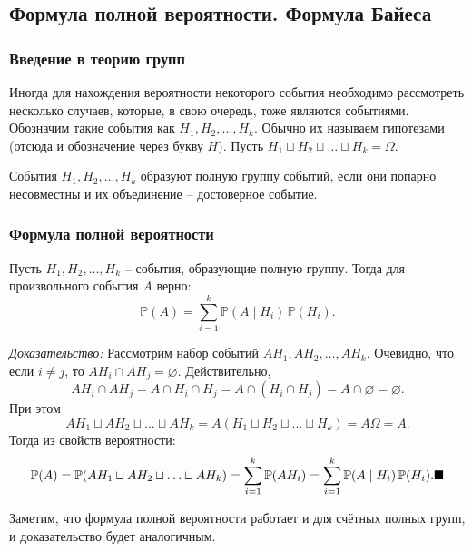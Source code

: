 \subsection{Формула полной вероятности. Формула Байеса}
\subsubsection{Введение в теорию групп}
Иногда для нахождения вероятности некоторого события необходимо рассмотреть несколько случаев, которые, в свою очередь, тоже являются событиями. Обозначим такие события как $H_1, H_2, \ldots, H_k$. Обычно их называем гипотезами (отсюда и обозначение через букву $H$). Пусть $H_1 \sqcup H_2 \sqcup \ldots \sqcup H_k = \Omega$.

\begin{definition}
События $H_1, H_2, \ldots, H_k$ образуют полную группу событий, если они попарно несовместны и их объединение -- достоверное событие.
\end{definition}

\subsubsection{Формула полной вероятности}

\begin{theorem}
Пусть $H_1, H_2, \ldots, H_k$ -- события, образующие полную группу. Тогда для произвольного события $A$ верно:
\[
\mathbb{P}(A) = \sum_{i=1}^{k} \mathbb{P}(A \mid H_i) \, \mathbb{P}(H_i).
\]
\end{theorem}

\textit{Доказательство:} Рассмотрим набор событий $AH_1, AH_2, \ldots, AH_k$. Очевидно, что если $i \neq j$, то $AH_i \cap AH_j = \varnothing$. Действительно,
\[
AH_i \cap AH_j = A \cap H_i \cap H_j = A \cap (H_i \cap H_j) = A \cap \varnothing = \varnothing.
\]
При этом
\[
AH_1 \sqcup AH_2 \sqcup \ldots \sqcup AH_k = A(H_1 \sqcup H_2 \sqcup \ldots \sqcup H_k) = A\Omega = A.
\]
Тогда из свойств вероятности:
\[
\mathbb{P}(A) = \mathbb{P}(AH_1 \sqcup AH_2 \sqcup \ldots \sqcup AH_k) = \sum_{i=1}^{k} \mathbb{P}(AH_i) = \sum_{i=1}^{k} \mathbb{P}(A \mid H_i) \, \mathbb{P}(H_i). \hfill \blacksquare
\]

\begin{notice}
Заметим, что формула полной вероятности работает и для счётных полных групп, и доказательство будет аналогичным.
\end{notice}

